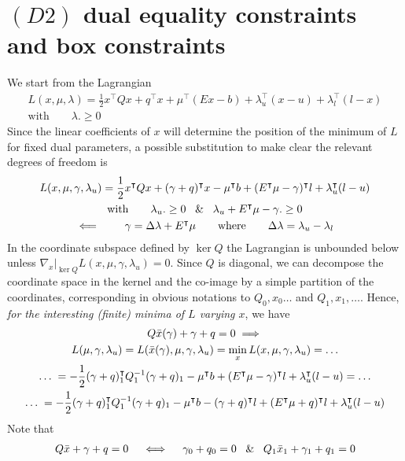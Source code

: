 \documentclass[twoside]{mfitjournal}
\begin{document}
\section*{$(D2)$ dual equality constraints and box constraints}
We start from the Lagrangian
    \begin{gather*}
    L(x, \mu, \lambda) = \frac{1}{2}x^\intercal Q x + q^\intercal x + \mu^\intercal(Ex - b) + \lambda_u^\intercal(x-u) + \lambda_l^\intercal(l-x) \\
    \textrm{with} \qquad \lambda .\ge 0
    \end{gather*}
Since the linear coefficients of $x$ will determine the position of the minimum of $L$ for fixed dual parameters, a possible substitution to make clear the relevant degrees of freedom is
    \begin{gather*}
    L(x, \mu, \gamma, \lambda_u) = \frac{1}{2}x^\intercal Q x + (\gamma + q)^\intercal x - \mu^\intercal b + (E^\intercal\mu - \gamma)^\intercal l + \lambda_u^\intercal(l-u) \\
    \textrm{with} \qquad \lambda_u .\ge 0 \; \And \; \lambda_u + E^\intercal\mu - \gamma .\ge 0 \\
    \impliedby \qquad
    \gamma = \Delta \lambda + E^\intercal \mu \qquad \textrm{where} \qquad \Delta \lambda = \lambda_u - \lambda_l
    \end{gather*}
In the coordinate subspace defined by $\ker Q$ the Lagrangian is unbounded below unless $\nabla_x|_{\ker Q} L(x, \mu, \gamma, \lambda_u) = 0$.
Since $Q$ is diagonal, we can decompose the coordinate space in the kernel and the co-image by a simple partition of the coordinates, corresponding in obvious notations to $Q_0, x_0 \dots$ and $Q_1, x_1, \dots$. Hence, \emph{for the interesting (finite) minima of $L$ varying $x$}, we have
    \begin{gather*}
    Q \Bar{x}(\gamma) + \gamma + q = 0 \implies \\
    L(\mu, \gamma, \lambda_u) = L(\Bar{x}(\gamma), \mu, \gamma, \lambda_u) = \min_x L(x, \mu, \gamma, \lambda_u) = \dots \\ 
    \dots \; = -\frac{1}{2}(\gamma + q)_1^\intercal Q_1^{-1} (\gamma + q)_1 - \mu^\intercal b + (E^\intercal\mu - \gamma)^\intercal l + \lambda_u^\intercal(l-u) = \dots \\
    \dots \; = -\frac{1}{2}(\gamma + q)_1^\intercal Q_1^{-1} (\gamma + q)_1 - \mu^\intercal b - (\gamma + q)^\intercal l + (E^\intercal\mu + q)^\intercal l + \lambda_u^\intercal(l-u)
    \end{gather*}
Note that
    \begin{gather*} 
    Q \Bar{x} + \gamma + q = 0 \quad \iff \quad \gamma_0 + q_0 = 0 \; \And \; Q_1 \Bar{x}_1 + \gamma_1 + q_1 = 0
    \end{gather*}
\end{document}
